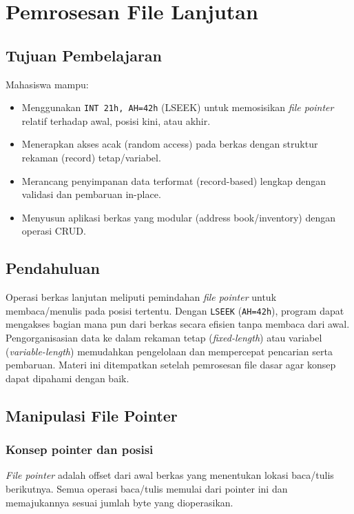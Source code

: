 \documentclass[../main.tex]{subfiles}
\begin{document}
\chapter{Pemrosesan File Lanjutan}

    \section{Tujuan Pembelajaran}
        Mahasiswa mampu:
        \begin{itemize}
            \item Menggunakan \texttt{INT 21h, AH=42h} (LSEEK) untuk memosisikan \textit{file pointer} relatif terhadap awal, posisi kini, atau akhir.
            \item Menerapkan akses acak (random access) pada berkas dengan struktur rekaman (record) tetap/variabel.
            \item Merancang penyimpanan data terformat (record-based) lengkap dengan validasi dan pembaruan in-place.
            \item Menyusun aplikasi berkas yang modular (address book/inventory) dengan operasi CRUD.
        \end{itemize}

    \section{Pendahuluan}
        Operasi berkas lanjutan meliputi pemindahan \textit{file pointer} untuk membaca/menulis pada posisi tertentu. Dengan \texttt{LSEEK} (\texttt{AH=42h}), program dapat mengakses bagian mana pun dari berkas secara efisien tanpa membaca dari awal. Pengorganisasian data ke dalam rekaman tetap (\textit{fixed-length}) atau variabel (\textit{variable-length}) memudahkan pengelolaan dan mempercepat pencarian serta pembaruan. Materi ini ditempatkan setelah pemrosesan file dasar agar konsep dapat dipahami dengan baik.

    \section{Manipulasi File Pointer}
        \subsection{Konsep pointer dan posisi}
            \textit{File pointer} adalah offset dari awal berkas yang menentukan lokasi baca/tulis berikutnya. Semua operasi baca/tulis memulai dari pointer ini dan memajukannya sesuai jumlah byte yang dioperasikan.
\end{document}
